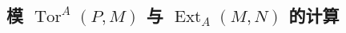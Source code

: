 \chapter{}
\section{模 \texorpdfstring{$\operatorname{Tor}^{A}(P,M)$}{TorA(P,M)} 与 \texorpdfstring{$\operatorname{Ext}_{A}(M,N)$}{ExtA(M,N)} 的计算}
